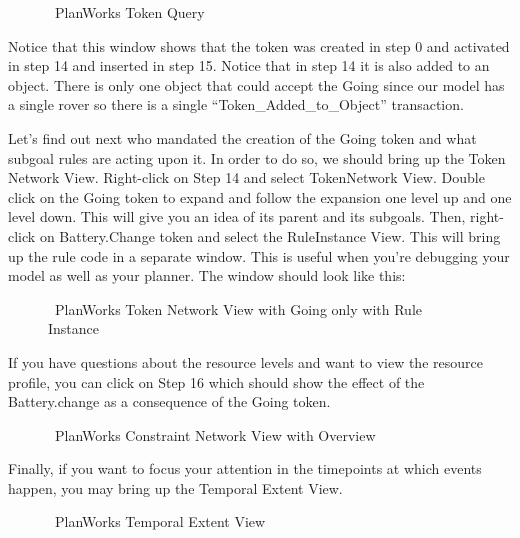 \documentclass[10pt, letterpaper, twoside]{article}
\begin{document}
\begin{figure}[htb]
\centering{}
\caption{\ET\, PlanWorks Token Query}
\label{TokenQuery}
\end{figure}

Notice that this window shows that the token was created in step 0 and
activated in step 14 and inserted in step 15.  Notice that in step 14 it is
also added to an object.  There is only one object that could accept the
Going since our model has a single rover so there is a single
``Token\_Added\_to\_Object'' transaction.

Let's find out next who mandated the creation of the Going token and what
subgoal rules are acting upon it.  In order to do so, we should bring up
the Token Network View.  Right-click on Step 14 and select TokenNetwork
View. Double click on the Going token to expand and follow the expansion
one level up and one level down.  This will give you an idea of its parent
and its subgoals.  Then, right-click on Battery.Change token and select the
RuleInstance View.  This will bring up the rule code in a separate window.
This is useful when you're debugging your model as well as your planner.
The window should look like this:

\begin{figure}[htb]
\centering{}
\caption{\ET\, PlanWorks Token Network View with Going only with Rule Instance}
\label{TokenNetwork-RuleInstance}
\end{figure}


If you have questions about the resource levels and want to view the
resource profile, you can click on Step 16 which should show the effect of
the Battery.change as a consequence of the Going token. 

\begin{figure}[h]
\centering{}
\caption{\ET\, PlanWorks Constraint Network View with Overview}
\label{ConstraintNetworkOverview}
\end{figure}

Finally, if you want to focus your attention in the timepoints at which
events happen, you may bring up the Temporal Extent View.
\begin{figure}[h]
\centering{}
\caption{\ET\, PlanWorks Temporal Extent View}
\label{TemporalExtentView}
\end{figure}
\end{document}
